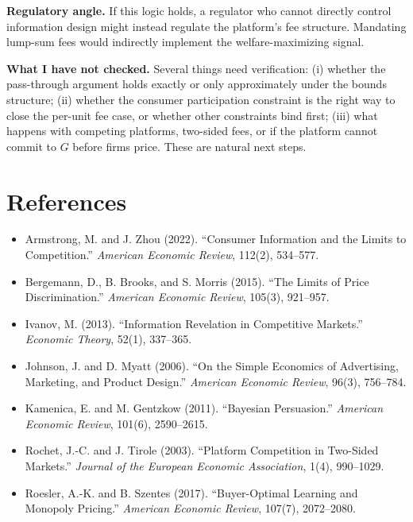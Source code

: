 \documentclass[12pt, a4paper]{article}
\begin{document}
\textbf{Regulatory angle.} If this logic holds, a regulator who cannot directly control information design might instead regulate the platform's fee structure. Mandating lump-sum fees would indirectly implement the welfare-maximizing signal.

\textbf{What I have not checked.} Several things need verification: (i) whether the pass-through argument holds exactly or only approximately under the bounds structure; (ii) whether the consumer participation constraint is the right way to close the per-unit fee case, or whether other constraints bind first; (iii) what happens with competing platforms, two-sided fees, or if the platform cannot commit to $G$ before firms price. These are natural next steps.

\section*{References}

\begin{itemize}[nosep, leftmargin=*]
    \item Armstrong, M. and J. Zhou (2022). ``Consumer Information and the Limits to Competition.'' \textit{American Economic Review}, 112(2), 534--577.
    \item Bergemann, D., B. Brooks, and S. Morris (2015). ``The Limits of Price Discrimination.'' \textit{American Economic Review}, 105(3), 921--957.
    \item Ivanov, M. (2013). ``Information Revelation in Competitive Markets.'' \textit{Economic Theory}, 52(1), 337--365.
    \item Johnson, J. and D. Myatt (2006). ``On the Simple Economics of Advertising, Marketing, and Product Design.'' \textit{American Economic Review}, 96(3), 756--784.
    \item Kamenica, E. and M. Gentzkow (2011). ``Bayesian Persuasion.'' \textit{American Economic Review}, 101(6), 2590--2615.
    \item Rochet, J.-C. and J. Tirole (2003). ``Platform Competition in Two-Sided Markets.'' \textit{Journal of the European Economic Association}, 1(4), 990--1029.
    \item Roesler, A.-K. and B. Szentes (2017). ``Buyer-Optimal Learning and Monopoly Pricing.'' \textit{American Economic Review}, 107(7), 2072--2080.
\end{itemize}
\end{document}
